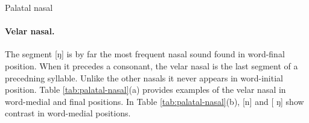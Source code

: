 \begin{table}[!htb] \small
\centering
\caption{Palatal nasal\label{tab:palatal-nasal}}

\quad
{}
\end{table}

\paragraph{Velar nasal.}
\label{sec:velar-nasal}

The segment [{\sls ŋ}] is by far 
the most frequent nasal sound found in word-final position.  When it precedes a 
consonant, the velar nasal is  the last segment of  a precedning syllable.  
Unlike the other nasals it never appears in word-initial position. Table 
\ref{tab:palatal-nasal}(a)  provides  examples of the velar nasal in word-medial 
and final positions. In Table \ref{tab:palatal-nasal}(b),   [{\sls n}] and 
[{\sls 
ŋ}] show contrast in word-medial  positions. 

